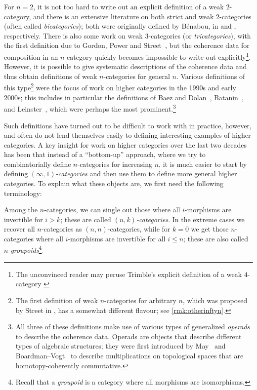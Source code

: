 \documentclass[a4paper,12pt]{article}
\begin{document}
For $n = 2$, it is not too hard to write out an explicit definition of
a weak $2$-category, and there is an extensive literature on both strict
and weak $2$-categories (often called \emph{bicategories}); both were
originally defined by B\'enabou, in \cite{Ben65} and \cite{Ben67},
respectively. There is also some work on weak $3$-categories (or
\emph{tricategories}), with the first definition due to Gordon, Power
and Street~\cite{GordonPowerStreet}, but the coherence data for
composition in an $n$-category quickly becomes impossible to write out
explicitly\footnote{The unconvinced reader may peruse Trimble's
  explicit definition of a weak $4$-category \cite{Trimble}}. However,
it is possible to give systematic descriptions of the coherence data
and thus obtain definitions of weak $n$-categories for general $n$.
Various definitions of this type\footnote{The first definition of weak
  $n$-categories for arbitrary $n$, which was proposed by Street in
  \cite{StreetOriented}, has a somewhat different flavour; see
  \cref{rmk:otherinftyn}.}  were the focus of work on higher
categories in the 1990s and early 2000s; this includes in particular the definitions
of Baez and Dolan~\cite{BDopetope}, Batanin~\cite{Batanin}, and Leinster~\cite{LeinsterOpds}, which were perhaps the most
prominent.\footnote{All three of these definitions make use of various
  types of generalized \emph{operads} to describe the coherence
  data. Operads are objects that describe different
  types of algebraic structures; they were first introduced by
  May~\cite{May} and Boardman--Vogt~\cite{BoardmanVogt} to describe
  multiplications on topological spaces that are homotopy-coherently
  commutative.}


Such definitions have turned out to be difficult to work with in
practice, however, and often do not lend themselves easily to defining
interesting examples of higher categories. A key insight for work on
higher categories over the last two decades has been that instead of a
``bottom-up'' approach, where we try to combinatorially define
$n$-categories for increasing $n$, it is much easier to start by
defining \emph{$(\infty,1)$-categories} and then use them to define
more general higher categories. To explain what these objects are, we
first need the following terminology:

\begin{defn}
  Among the $n$-categories, we can single out those where all
  $i$-morphisms are invertible for $i > k$; these are called
  \emph{$(n,k)$-categories}. In the extreme cases we recover all
  $n$-categories as $(n,n)$-categories, while for $k = 0$ we get those
  $n$-categories where all $i$-morphisms are invertible for all
  $i \leq n$; these are also called
  \emph{$n$-groupoids}\footnote{Recall that a \emph{groupoid} is a
    category where all morphisms are isomorphisms.}.
\end{defn}
\end{document}
